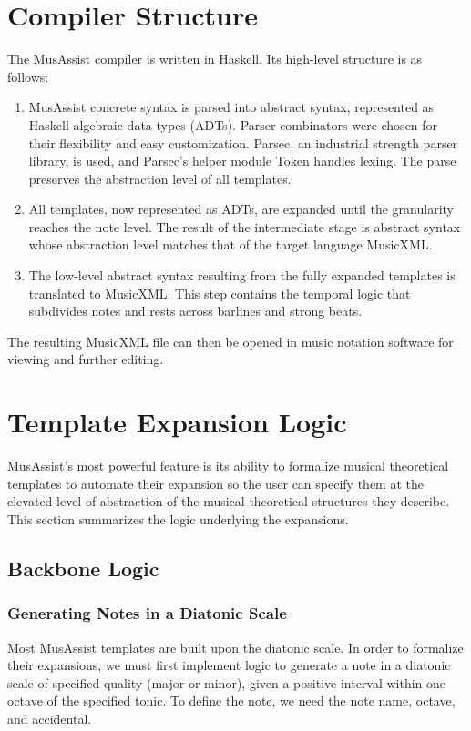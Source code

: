 \documentclass{article}
\begin{document}
\section{Compiler Structure}

The MusAssist compiler is written in Haskell. Its high-level structure is as follows: 

\begin{enumerate}
  \item MusAssist concrete syntax is parsed into abstract syntax, represented as 
  Haskell algebraic data types (ADTs). Parser combinators were chosen for their flexibility
  and easy customization. Parsec, an industrial strength parser library, is used, and 
  Parsec’s helper module Token handles lexing. The parse preserves the abstraction 
  level of all templates.

  \item All templates, now represented as ADTs, are expanded until the granularity reaches the note level. 
  The result of the intermediate stage is abstract syntax whose abstraction level
  matches that of the target language MusicXML. 

  \item The low-level abstract syntax resulting from the fully expanded templates is 
  translated to MusicXML. This step contains the temporal logic that subdivides notes and rests across
  barlines and strong beats.
\end{enumerate}

The resulting MusicXML file can then be opened in music notation software 
for viewing and further editing. 

\section{Template Expansion Logic}
MusAssist's most powerful feature is its ability to formalize musical theoretical templates 
to automate their expansion so the user can specify them at the elevated level of abstraction 
of the musical theoretical structures they describe. This section summarizes the logic underlying the expansions.

\subsection{Backbone Logic}
\subsubsection{Generating Notes in a Diatonic Scale}
\label{sec:note_generate}
Most MusAssist templates are built upon the diatonic scale. In order to formalize their expansions, we must first implement logic to generate a note in a diatonic scale of specified quality (major or minor), given a positive interval within one octave of the specified tonic. To define the note, we need the note name, octave, and accidental.
\end{document}
